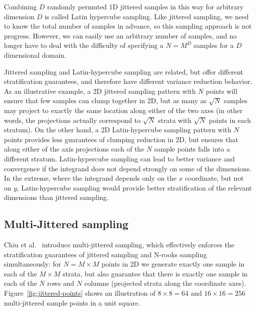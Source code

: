 \documentclass[11pt,fleqn]{book} %
\begin{document}
Combining $D$ randomly permuted 1D jittered samples in this way for arbitrary dimension $D$ is called Latin hypercube sampling. Like jittered sampling, we need to know the total number of samples in advance, so this sampling approach is not progress. However, we can easily use an arbitrary number of samples, and no longer have to deal with the difficulty of specifying a $N = M^D$ samples for a $D$ dimensional domain.

Jittered sampling and Latin-hypercube sampling are related, but offer different stratification guarantees, and therefore have different variance reduction behavior. As an illustrative example, a 2D jittered sampling pattern with $N$ points will ensure that few samples can clump together in 2D, but as many as $\sqrt{N}$ samples may project to exactly the same location along either of the two axes (in other words, the projections actually correspond to $\sqrt{N}$ strata with $\sqrt{N}$ points in each stratum). On the other hand, a 2D Latin-hypercube sampling pattern with $N$ points provides less guarantees of clumping reduction in 2D, but ensures that along either of the axis projections each of the $N$ sample points falls into a different stratum. Latin-hypercube sampling can lead to better variance and convergence if the integrand does not depend strongly on some of the dimensions. In the extreme, where the integrand depends only on the $x$ coordinate, but not on $y$, Latin-hypercube sampling would provide better stratification of the relevant dimensions than jittered sampling.
%

%

\subsection{Multi-Jittered sampling}
Chiu et al.~\cite{chiu94multi} introduce multi-jittered sampling, which effectively enforces the stratification guarantees of jittered sampling and N-rooks sampling simultaneously: for $N=M\times M$ points in 2D we generate exactly one sample in each of the $M\times M$ strata, but also guarantee that there is exactly one sample in each of the $N$ rows and $N$ columns (projected strata along the coordinate axes). Figure~\ref{fig:jittered-points} shows an illustration of $8\times8 = 64$ and $16\times16 = 256$ multi-jittered sample points in a unit square.
\end{document}
